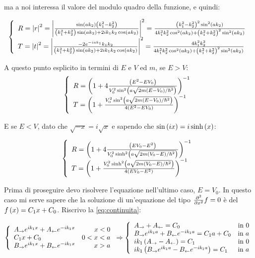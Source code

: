 ma a noi interessa il valore del modulo quadro della funzione, e quindi:

\begin{equation}
\lr\{.{\begin{array}{l}
	R = \lr||{r}^2 = \lr||{\frac{\sin\lrt{a k_2}\lrt{k_1^2-k_2^2}}{\lrt{k_1^2+k_2^2} \sin\lrt{a k_2}+2 i k_1 k_2 \cos\lrt{a k_2}}}^2=
	\frac{\lrt{k_1^2-k_2^2}^2\sin^2\lrt{a k_2}}{4 k_1^2 k_2^2 \cos^2\lrt{a k_2}+\lrt{k_1^2+k_2^2}^2\sin^2\lrt{a k_2}}\\
	T = \lr||{t}^2 = \lr||{\frac{-2e^{-i a k_1}k_1 k_2}{\lrt{k_1^2+k_2^2} \sin\lrt{a k_2}+2 i k_1 k_2 \cos\lrt{a k_2}}}^2=
	\frac{4 k_1^2 k_2^2}{4 k_1^2 k_2^2 \cos^2\lrt{a k_2}+\lrt{k_1^2+k_2^2}^2\sin^2\lrt{a k_2}}
	\end{array}}
\end{equation}

A questo punto esplicito in termini di $E$ e $V$ ed $m$, se $E>V$:
\begin{equation}
\lr\{.{\begin{array}{l}
	R = \lrt{1+4 \frac{\lrt{E^2 - EV_0}}{V_0^2\sin^2\lrt{a \sqrt{2m \lrt{E-V_0}/\hbar^2}}}}^{-1}\\
	T = \lrt{1 +\frac{V_0^2\sin^2\lrt{a \sqrt{2m \lrt{E-V_0}/\hbar^2}}}{4\lrt{E^2 - EV_0}} }^{-1}
	\end{array}}
\end{equation}

E se $E<V$, dato  che $\sqrt{-x} = i\sqrt{x}$ e sapendo che $\sin\lrt{i x} = i\sinh\lrt{x}$:

\begin{equation}
\lr\{.{\begin{array}{l}
	R = \lrt{1+4 \frac{\lrt{EV_0-E^2}}{V_0^2\sinh^2\lrt{a \sqrt{2m \lrt{V_0-E}/\hbar^2}}}}^{-1}\\
	T = \lrt{1 +\frac{V_0^2\sinh^2\lrt{a \sqrt{2m \lrt{V_0-E}/\hbar^2}}}{4\lrt{EV_0-E^2}} }^{-1}
	\end{array}}
\end{equation}

Prima di proseguire devo risolvere l'equazione nell'ultimo caso, $E=V_0$. In questo caso mi serve sapere che la soluzione di un'equazione del tipo $\pde{^2}{x^2}f=0$ \`e del $f\lrt{x}=C_1 x + C_0$. Riscrivo la \eqref{eq:continuita}:

\begin{equation}
\lr\{.{\begin{array}{lr}
	A_\to e^{ik_1x} + A_\from e^{-ik_1x}	&	x<0\\
	C_1 x + C_0	&	0<x<a\\
	B_\to e^{ik_1x} + B_\from e^{-ik_1x}	&	x>a
	\end{array}}\Rightarrow\lr\{.{\begin{array}{lr}
	A_\to  +A_\from = C_0															&	\text{in }0\\
	B_\to e^{ik_1a} +B_\from e^{-ik_1a} = C_1 a + C_0			&	\text{in }a\\
	i k_1\lrt{A_\to-A_\from} = C_1	&	\text{in }0\\
	i k_1\lrt{B_\to e^{ik_1a}-B_\from e^{-ik_1a}} = C_1	&	\text{in }a
	\end{array}}
\end{equation}

